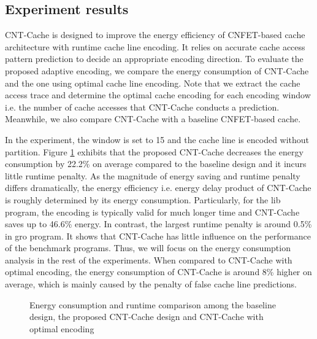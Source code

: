 \subsection{Experiment results}
CNT-Cache is designed to improve the energy efficiency of CNFET-based cache architecture with 
runtime cache line encoding. It relies on accurate cache access pattern prediction to 
decide an appropriate encoding direction. To evaluate the proposed adaptive encoding, 
we compare the energy consumption of CNT-Cache and the one using optimal cache line encoding.
Note that we extract the cache access trace and determine the optimal cache encoding for each 
encoding window i.e. the number of cache accesses that CNT-Cache conducts a prediction. 
Meanwhile, we also compare CNT-Cache with a baseline CNFET-based cache. 

In the experiment, the window is set to 15 and the cache line is encoded without partition. 
Figure \ref{fig:compare} exhibits that the proposed CNT-Cache decreases the energy 
consumption by 22.2\% on average compared to the baseline design and it incurs little 
runtime penalty. As the magnitude of energy saving and runtime penalty differs 
dramatically, the energy efficiency i.e. energy delay product of CNT-Cache is roughly 
determined by its energy consumption. Particularly, for the lib program, the encoding is typically valid 
for much longer time and CNT-Cache saves up to 46.6\% energy. In contrast, the largest runtime 
penalty is around 0.5\% in gro program. It shows that CNT-Cache has little influence on 
the performance of the benchmark programs. Thus, we will focus on the energy consumption 
analysis in the rest of the experiments. When compared to CNT-Cache 
with optimal encoding, the energy consumption of CNT-Cache is around 8\% higher on average, 
which is mainly caused by the penalty of false cache line predictions. 

\begin{figure}
	\center{}
	\caption{Energy consumption and runtime comparison among the baseline design, 
	the proposed CNT-Cache design and CNT-Cache with optimal encoding}
\label{fig:compare}
\vspace{-1.5em}
\end{figure}

